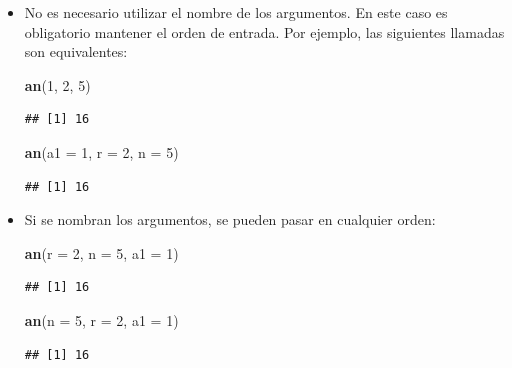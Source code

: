 \documentclass[]{book}
\newenvironment{Shaded}{\begin{snugshade}}{\end{snugshade}}
\newcommand{\DataTypeTok}[1]{\textcolor[rgb]{0.13,0.29,0.53}{#1}}
\newcommand{\DecValTok}[1]{\textcolor[rgb]{0.00,0.00,0.81}{#1}}
\newcommand{\KeywordTok}[1]{\textcolor[rgb]{0.13,0.29,0.53}{\textbf{#1}}}
\newcommand{\NormalTok}[1]{#1}
\begin{document}
\begin{itemize}
\item
  No es necesario utilizar el nombre de los argumentos. En este caso
  es obligatorio mantener el orden de entrada.
  Por ejemplo, las siguientes llamadas son equivalentes:

\begin{Shaded}
\begin{Highlighting}[]
\KeywordTok{an}\NormalTok{(}\DecValTok{1}\NormalTok{, }\DecValTok{2}\NormalTok{, }\DecValTok{5}\NormalTok{)}
\end{Highlighting}
\end{Shaded}

\begin{verbatim}
## [1] 16
\end{verbatim}

\begin{Shaded}
\begin{Highlighting}[]
\KeywordTok{an}\NormalTok{(}\DataTypeTok{a1 =} \DecValTok{1}\NormalTok{, }\DataTypeTok{r =} \DecValTok{2}\NormalTok{, }\DataTypeTok{n =} \DecValTok{5}\NormalTok{)}
\end{Highlighting}
\end{Shaded}

\begin{verbatim}
## [1] 16
\end{verbatim}
\item
  Si se nombran los argumentos, se pueden pasar en cualquier orden:

\begin{Shaded}
\begin{Highlighting}[]
\KeywordTok{an}\NormalTok{(}\DataTypeTok{r =} \DecValTok{2}\NormalTok{, }\DataTypeTok{n =} \DecValTok{5}\NormalTok{, }\DataTypeTok{a1 =} \DecValTok{1}\NormalTok{)}
\end{Highlighting}
\end{Shaded}

\begin{verbatim}
## [1] 16
\end{verbatim}

\begin{Shaded}
\begin{Highlighting}[]
\KeywordTok{an}\NormalTok{(}\DataTypeTok{n =} \DecValTok{5}\NormalTok{, }\DataTypeTok{r =} \DecValTok{2}\NormalTok{, }\DataTypeTok{a1 =} \DecValTok{1}\NormalTok{)}
\end{Highlighting}
\end{Shaded}

\begin{verbatim}
## [1] 16
\end{verbatim}
\end{itemize}
\end{document}
